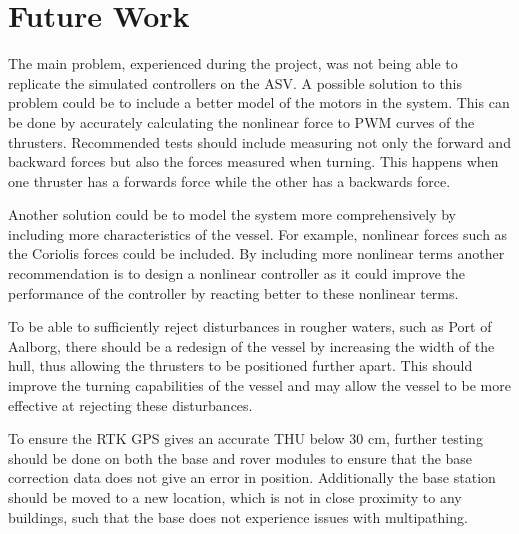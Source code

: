 \chapter{Future Work}

The main problem, experienced during the project, was not being able to replicate the simulated controllers on the ASV. A possible solution to this problem could be to include a better model of the motors in the system. This can be done by accurately calculating the nonlinear force to PWM curves of the thrusters. Recommended tests should include measuring not only the forward and backward forces but also the forces measured when turning. This happens when one thruster has a forwards force while the other has a backwards force.

Another solution could be to model the system more comprehensively by including more characteristics of the vessel. For example, nonlinear forces such as the Coriolis forces could be included. By including more nonlinear terms another recommendation is to design a nonlinear controller as it could improve the performance of the controller by reacting better to these nonlinear terms.

To be able to sufficiently reject disturbances in rougher waters, such as Port of Aalborg, there should be a redesign of the vessel by increasing the width of the hull, thus allowing the thrusters to be positioned further apart. This should improve the turning capabilities of the vessel and may allow the vessel to be more effective at rejecting these disturbances.

To ensure the RTK GPS gives an accurate THU below 30 cm, further testing should be done on both the base and rover modules to ensure that the base correction data does not give an error in position.
Additionally the base station should be moved to a new location, which is not in close proximity to any buildings, such that the base does not experience issues with multipathing.


% 

